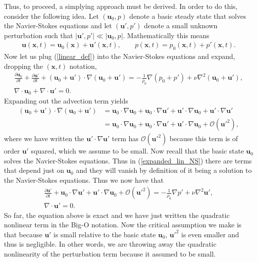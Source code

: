 Thus, to proceed, a simplying approach must be derived. In order to do this, consider the following idea. Let $(\bm{u}_{0},p)$ denote a basic steady state that solves the Navier-Stokes equations and let $(\bm{u}',p')$ denote a small unknown perturbation such that $|\bm{u}',p'|\ll |\bm{u}_{0},p|$. Mathematically this means
\begin{align}
\bm{u}(\bm{x},t) = \bm{u}_{0}(\bm{x}) + \bm{u}'(\bm{x},t),\qquad\label{linear_def} p(\bm{x},t) = p_{0}(\bm{x},t) + p'(\bm{x},t).
\end{align}
Now let us plug (\ref{linear_def}) into the Navier-Stokes equations and expand, dropping the $(\bm{x},t)$ notation,
\begin{align}
\frac{\partial \bm{u}_{0}}{\partial t} + \frac{\partial \bm{u}'}{\partial t} + (\bm{u}_{0}+\bm{u}')\cdot\nabla(\bm{u}_{0}+\bm{u}') = -\frac{1}{\rho_{0}}\nabla(p_{0} + p') + \nu\nabla^{2}(\bm{u}_{0} + \bm{u}'),\\\label{expanded_lin_NS}
\nabla \cdot \bm{u}_{0} + \nabla \cdot \bm{u}'=0.
\end{align} Expanding out the advection term yields
\begin{align}
 (\bm{u}_{0}+\bm{u}')\cdot\nabla(\bm{u}_{0}+\bm{u}') &= \bm{u}_{0}\cdot\nabla\bm{u}_{0} + \bm{u}_{0}\cdot\nabla \bm{u}' + \bm{u}'\cdot\nabla\bm{u}_{0} + \bm{u}'\cdot\nabla\bm{u}'\\
&= \bm{u}_{0}\cdot\nabla\bm{u}_{0} + \bm{u}_{0}\cdot\nabla \bm{u}' + \bm{u}'\cdot\nabla\bm{u}_{0} + \mathcal{O}(\bm{u}'^{2}),
\end{align}
where we have written the $\bm{u}'\cdot\nabla\bm{u}'$ term has $\mathcal{O}(\bm{u}'^{2})$ because this term is of order $\bm{u}'$ squared, which we assume to be small. Now recall that the basic state $\bm{u}_{0}$ solves the Navier-Stokes equations. Thus in (\ref{expanded_lin_NS}) there are terms that depend just on $\bm{u}_{0}$ and they will vanish by definition of it being a solution to the Navier-Stokes equations. Thus we now have that
\begin{align}
\frac{\partial \bm{u}'}{\partial t} + \bm{u}_{0}\cdot\nabla \bm{u}' + \bm{u}'\cdot\nabla\bm{u}_{0} + \mathcal{O}(\bm{u}'^{2})  = -\frac{1}{\rho_{0}}\nabla p' + \nu\nabla^{2}\bm{u}',\\
 \nabla \cdot \bm{u}'=0.
\end{align}
So far, the equation above is exact and we have just written the quadratic nonlinear term in the Big-O notation. Now the critical assumption we make is that because $\bm{u}'$ is small relative to the basic state $\bm{u}_{0}$, $\bm{u}'^{2}$ is even smaller and thus is negligible. In other words, we are throwing away the quadratic nonlinearity of the perturbation term because it assumed to be small. 

